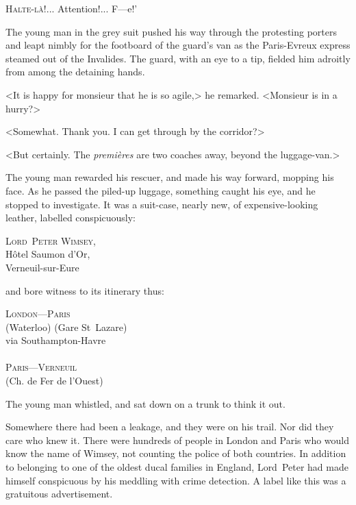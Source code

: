 
\lettrine[lines=4,ante=‘]{H}{alte-là!}... Attention!... F—e!'

\zz
The young man in the grey suit pushed his way through the protesting porters and leapt nimbly for the footboard of the guard's van as the Paris-Evreux express steamed out of the Invalides. The guard, with an eye to a tip, fielded him adroitly from among the detaining hands.

<It is happy for monsieur that he is so agile,> he remarked. <Monsieur is in a hurry?>

<Somewhat. Thank you. I can get through by the corridor?>

<But certainly. The \textit{premières} are two coaches away, beyond the luggage-van.>

The young man rewarded his rescuer, and made his way forward, mopping his face. As he passed the piled-up luggage, something caught his eye, and he stopped to investigate. It was a suit-case, nearly new, of expensive-looking leather, labelled conspicuously:

\vspace{-0.2cm}

\begin{center}
\textsc{Lord~Peter Wimsey},\\
Hôtel Saumon d'Or,\\
Verneuil-sur-Eure
\end{center}

\vspace{-0.2cm}
\noindent and bore witness to its itinerary thus:
\vspace{-0.2cm}

\begin{center}
\textsc{London—Paris}\\
(Waterloo) (Gare St~Lazare)\\
via Southampton-Havre\\
~\\
\textsc{Paris—Verneuil}\\
(Ch. de Fer de l'Ouest)
\end{center}

The young man whistled, and sat down on a trunk to think it out.

Somewhere there had been a leakage, and they were on his trail. Nor did they care who knew it. There were hundreds of people in London and Paris who would know the name of Wimsey, not counting the police of both countries. In addition to belonging to one of the oldest ducal families in England, Lord~Peter had made himself conspicuous by his meddling with crime detection. A label like this was a gratuitous advertisement.

